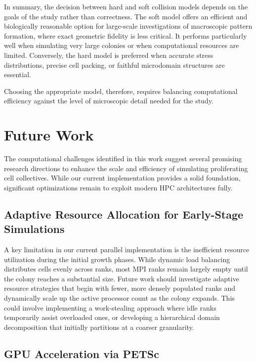 \documentclass[conference]{IEEEtran}
\begin{document}
In summary, the decision between hard and soft collision models depends on the goals of the study rather than correctness. The soft model offers an efficient and biologically reasonable option for large-scale investigations of macroscopic pattern formation, where exact geometric fidelity is less critical. It performs particularly well when simulating very large colonies or when computational resources are limited. Conversely, the hard model is preferred when accurate stress distributions, precise cell packing, or faithful microdomain structures are essential.

Choosing the appropriate model, therefore, requires balancing computational efficiency against the level of microscopic detail needed for the study.

\section{Future Work}

The computational challenges identified in this work suggest several promising research directions to enhance the scale and efficiency of simulating proliferating cell collectives. While our current implementation provides a solid foundation, significant optimizations remain to exploit modern HPC architectures fully.

\subsection{Adaptive Resource Allocation for Early-Stage Simulations}

A key limitation in our current parallel implementation is the inefficient resource utilization during the initial growth phases. While dynamic load balancing distributes cells evenly across ranks, most MPI ranks remain largely empty until the colony reaches a substantial size. Future work should investigate adaptive resource strategies that begin with fewer, more densely populated ranks and dynamically scale up the active processor count as the colony expands. This could involve implementing a work-stealing approach where idle ranks temporarily assist overloaded ones, or developing a hierarchical domain decomposition that initially partitions at a coarser granularity.

\subsection{GPU Acceleration via PETSc}
\end{document}
